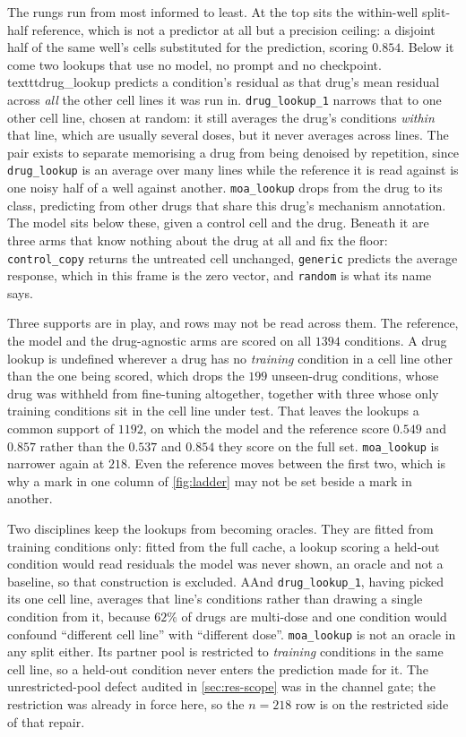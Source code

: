 The rungs run from most informed to least. At the top sits the within-well
split-half reference, which is not a predictor at all but a precision ceiling: a
disjoint half of the same well's cells substituted for the prediction, scoring
$0.854$. Below it come two lookups that use no model, no prompt and no checkpoint.
\\texttt{drug\_lookup} predicts a condition's residual as that drug's mean residual
across \emph{all} the other cell lines it was run in. \texttt{drug\_lookup\_1}
narrows that to one other cell line, chosen at random: it still averages the
drug's conditions \emph{within} that line, which are usually several doses, but it
never averages across lines. The pair exists to separate memorising a drug from
being denoised by repetition, since \texttt{drug\_lookup} is an average over many
lines while the reference it is read against is one noisy half of a well against
another. \texttt{moa\_lookup} drops
from the drug to its class, predicting from other drugs that share this drug's
mechanism annotation. The model sits below these, given a control cell and the
drug. Beneath it are three arms that know nothing about the drug at all and fix
the floor: \texttt{control\_copy} returns the untreated cell unchanged,
\texttt{generic} predicts the average response, which in this frame is the zero
vector, and \texttt{random} is what its name says.

Three supports are in play, and rows may not be read across them. The reference,
the model and the drug-agnostic arms are scored on all $\num{1394}$ conditions.
A drug lookup is undefined wherever a drug has no
\emph{training} condition in a cell line other than the one being scored, which
drops the $\num{199}$ unseen-drug conditions, whose drug was withheld from
fine-tuning altogether, together with three whose only training conditions sit in
the cell line under test. That leaves the lookups a common support of
$\num{1192}$, on which the model and the reference score $0.549$ and $0.857$
rather than the $0.537$ and $0.854$ they score on the full set.
\texttt{moa\_lookup} is narrower again at $\num{218}$. Even
the reference moves between the first two, which is why a mark in one column of
\cref{fig:ladder} may not be set beside a mark in another.

Two disciplines keep the lookups from becoming oracles. They are fitted from
training conditions only: fitted from the full cache, a lookup scoring a held-out
condition would read residuals the model was never shown, an oracle and not a
baseline, so that construction is excluded. AAnd \texttt{drug\_lookup\_1}, having
picked its one cell line, averages that line's conditions rather than drawing a
single condition from it, because $62\%$ of drugs are multi-dose and one condition
would confound ``different cell line'' with ``different dose''. \texttt{moa\_lookup} is not an oracle in any split either. Its
partner pool is restricted to \emph{training} conditions in the same cell line, so
a held-out condition never enters the prediction made for it. The
unrestricted-pool defect audited in \cref{sec:res-scope} was in the channel gate;
the restriction was already in force here, so the $n = \num{218}$ row is on the
restricted side of that repair.

